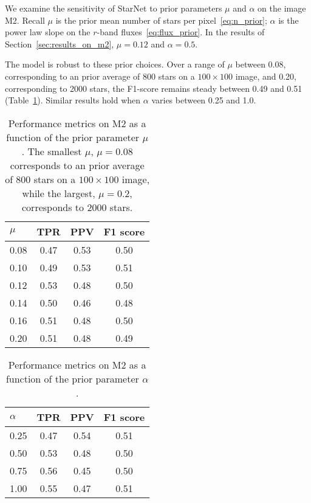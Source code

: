 
We examine the sensitivity of StarNet to prior parameters $\mu$ and $\alpha$ on the image M2. 
Recall $\mu$ is the prior mean number of stars per pixel~\eqref{eq:n_prior};
$\alpha$ is the power law slope on the $r$-band fluxes~\eqref{eq:flux_prior}. 
In the results of Section~\ref{sec:results_on_m2}, $\mu=0.12$ and  $\alpha = 0.5$. 

The model is robust to these prior choices. 
Over a  range of $\mu$ between 0.08, corresponding to 
an prior average of 800 stars on a $100\times100$ image, 
and 0.20, corresponding to 2000 stars, 
the F1-score remains steady between 0.49 and 0.51 (Table~\ref{tab:mu_sensitivity}). 
Similar results hold when $\alpha$ varies between 
0.25 and 1.0. 

\begin{table}[!tb]
\centering
\caption{Performance metrics on M2 as a function of 
the prior parameter $\mu$. 
The smallest $\mu$, $\mu = 0.08$ corresponds to 
an prior average of 800 stars on a $100\times100$ image, 
while the largest, $\mu = 0.2$, corresponds to 2000 stars. }
\label{tab:mu_sensitivity}
\begin{tabular}{l|ccc}
\toprule
$\mu$ &   TPR &   PPV &  F1 score \\
\midrule
0.08 &  0.47 &  0.53 & 0.50 \\
0.10 &  0.49 &  0.53 & 0.51 \\
0.12 &  0.53 &  0.48 & 0.50 \\
0.14 &  0.50 &  0.46 & 0.48 \\
0.16 &  0.51 &  0.48 & 0.50 \\
0.20 &  0.51 &  0.48 & 0.49 \\
\bottomrule
\end{tabular}
\end{table}


\begin{table}[!tb]
\centering
\caption{Performance metrics on M2 as a function of 
the prior parameter $\alpha$. }
\label{tab:alpha_sensitivity}
\begin{tabular}{l|ccc}
\toprule
$\alpha$ &   TPR &   PPV &  F1 score \\
\midrule
0.25 &  0.47 &  0.54 & 0.51 \\
0.50 &  0.53 &  0.48 & 0.50 \\
0.75 &  0.56 &  0.45 & 0.50 \\
1.00 &  0.55 &  0.47 & 0.51 \\
\bottomrule
\end{tabular}
\end{table}

